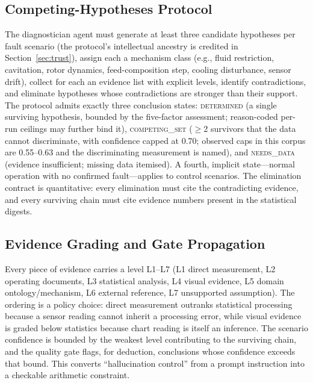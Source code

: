 \documentclass[preprint,10pt]{elsarticle}
\begin{document}
\subsection{Competing-Hypotheses Protocol}
The diagnostician agent must generate at least three candidate hypotheses per fault scenario (the protocol's intellectual ancestry is credited in Section~\ref{sec:trust}), assign each a mechanism class (e.g., fluid restriction, cavitation, rotor dynamics, feed-composition step, cooling disturbance, sensor drift), collect for each an evidence list with explicit levels, identify contradictions, and eliminate hypotheses whose contradictions are stronger than their support. The protocol admits exactly three conclusion states: \mbox{\textsc{determined}} (a single surviving hypothesis, bounded by the five-factor assessment; reason-coded per-run ceilings may further bind it), \mbox{\textsc{competing\_set}} ($\ge$2 survivors that the data cannot discriminate, with confidence capped at 0.70; observed caps in this corpus are 0.55--0.63 and the discriminating measurement is named), and \mbox{\textsc{needs\_data}} (evidence insufficient; missing data itemised). A fourth, implicit state---normal operation with no confirmed fault---applies to control scenarios. The elimination contract is quantitative: every elimination must cite the contradicting evidence, and every surviving chain must cite evidence numbers present in the statistical digests.

\subsection{Evidence Grading and Gate Propagation}\label{sec:method-grading}
Every piece of evidence carries a level L1--L7 (L1 direct measurement, L2 operating documents, L3 statistical analysis, L4 visual evidence, L5 domain ontology/mechanism, L6 external reference, L7 unsupported assumption). The ordering is a policy choice: direct measurement outranks statistical processing because a sensor reading cannot inherit a processing error, while visual evidence is graded below statistics because chart reading is itself an inference. The scenario confidence is bounded by the weakest level contributing to the surviving chain, and the quality gate flags, for deduction, conclusions whose confidence exceeds that bound. This converts ``hallucination control'' from a prompt instruction into a checkable arithmetic constraint.
\end{document}
